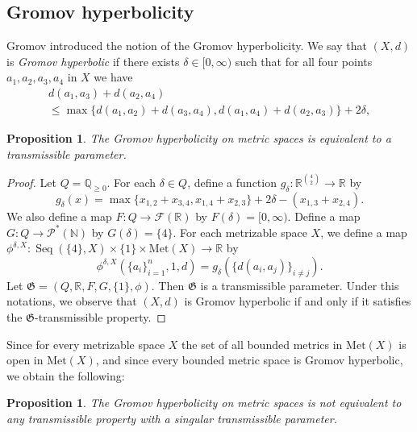 \documentclass[a4paper, 12pt]{amsart}
\theoremstyle{plain}
\newtheorem{prop}[thm]{Proposition}
\theoremstyle{definition}
\theoremstyle{remark}
\newcommand{\nn}{\mathbb{N}}
\newcommand{\qq}{\mathbb{Q}}
\newcommand{\rr}{\mathbb{R}}
\DeclareMathOperator{\seq}{Seq}
\newcommand{\met}[1]{\mathrm{Met}(#1)}
\begin{document}
\subsection{Gromov hyperbolicity}

Gromov 
\cite{MR919829}
 introduced the notion of 
the Gromov hyperbolicity. 
We say that 
$(X, d)$ 
is \emph{Gromov hyperbolic} if 
there exists 
$\delta\in [0, \infty)$ 
such that for all four points 
$a_{1}, a_{2}, a_{3}, a_{4}$ 
in  
$X$ 
we have 
\begin{multline*}
	d(a_{1}, a_{3})+d(a_{2}, a_{4})\\
	\le \max\{d(a_{1}, a_{2})+d(a_{3}, a_{4}), d(a_{1}, a_{4})+d(a_{2}, a_{3})\}+2\delta, 
\end{multline*}

\begin{prop}
 The Gromov hyperbolicity on metric spaces  is equivalent to a transmissible parameter. 
\end{prop}
\begin{proof}
Let
 $Q=\qq_{\ge 0}$. 
 For each 
 $\delta\in Q$, 
define a function 
$g_{\delta}\colon  \rr^{\binom{4}{2}}\to \rr$ 
by 
\[
	g_{\delta}(x)=
\max\{x_{1, 2}+x_{3, 4},  x_{1, 4}+x_{2, 3}\}+2\delta-(x_{1, 3}+x_{2, 4}). 
\]
We also  define a map  
$F\colon Q\to \mathcal{F}(\rr)$ 
by 
$F(\delta)=[0, \infty)$. 
Define a map 
$G\colon  Q\to \mathcal{P}^*(\nn)$ 
by 
$G(\delta)=\{4\}$. 
For each  metrizable space
 $X$,  
we define a map
$\phi^{\delta, X}\colon  
\seq(\{4\}, X)\times \{1\}\times \met{X}\to \rr$ 
by 
\[
	\phi^{\delta, X}(\{a_{i}\}_{i=1}^{n}, 1, d)=g_{\delta}(\{d(a_{i}, a_{j})\}_{i\neq j}). 
\]
Let 
$\mathfrak{G}=(Q, \rr,  F, G, \{1\}, \phi)$. 
Then 
$\mathfrak{G}$ 
is a transmissible parameter. 
Under this notations, 
we observe that 
$(X, d)$ is Gromov hyperbolic 
if and only if 
it satisfies the 
$\mathfrak{G}$-transmissible property. 
\end{proof}



Since for every metrizable space 
$X$ 
the set of all bounded metrics in 
$\met{X}$ 
is open in
$\met{X}$,  
and since every bounded metric space is Gromov hyperbolic, 
we obtain the following:
\begin{prop}\label{prop:Gro}
The Gromov hyperbolicity on metric spaces  is 
not equivalent to any transmissible  property 
with a singular transmissible parameter. 
\end{prop}
\end{document}
